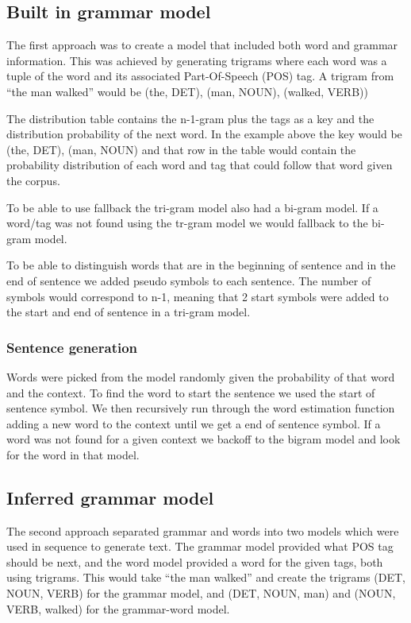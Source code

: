 \documentclass[a4paper,12pt]{article}
\begin{document}
\subsection{Built in grammar model}
The first approach was to create a model that included both word and grammar information. This was achieved by generating trigrams where each word was a tuple of the word and its associated Part-Of-Speech (POS) tag. A trigram from ``the man walked'' would be (the, DET), (man, NOUN), (walked, VERB))

The distribution table contains the n-1-gram plus the tags as a key and the distribution probability of the next word. In the example above the key would be (the, DET), (man, NOUN) and that row in the table would contain the probability distribution of each word and tag that could follow that word given the corpus.

To be able to use fallback the tri-gram model also had a bi-gram model. If a word/tag was not found using the tr-gram model we would fallback to the bi-gram model.

To be able to distinguish words that are in the beginning of sentence and in the end of sentence we added pseudo symbols to each sentence. The number of symbols would correspond to n-1, meaning that 2 start symbols were added to the start and end of sentence in a tri-gram model.

\subsubsection{Sentence generation}
Words were picked from the model randomly given the probability of that word and the context. To find the word to start the sentence we used the start of sentence symbol. We then recursively run through the word estimation function adding a new word to the context until we get a end of sentence symbol. If a word was not found for a given context we backoff to the bigram model and look for the word in that model.

\subsection{Inferred grammar model}
The second approach separated grammar and words into two models which were used in sequence to generate text. The grammar model provided what POS tag should be next, and the word model provided a word for the given tags, both using trigrams. This would take ``the man walked'' and create the trigrams (DET, NOUN, VERB) for the grammar model, and (DET, NOUN, man) and (NOUN, VERB, walked) for the grammar-word model.
\end{document}
